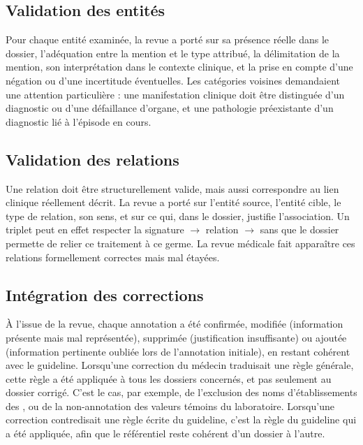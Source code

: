 \subsection{Validation des entités}\label{sec:c3-3-9-2}

Pour chaque entité examinée, la revue a porté sur sa présence réelle dans le dossier, l’adéquation entre la mention et le type attribué, la délimitation de la mention, son interprétation dans le contexte clinique, et la prise en compte d’une négation ou d’une incertitude éventuelles. Les catégories voisines demandaient une attention particulière : une manifestation clinique doit être distinguée d’un diagnostic ou d’une défaillance d’organe, et une pathologie préexistante d’un diagnostic lié à l’épisode en cours.

\subsection{Validation des relations}\label{sec:c3-3-9-3}

Une relation doit être structurellement valide, mais aussi correspondre au lien clinique réellement décrit. La revue a porté sur l’entité source, l’entité cible, le type de relation, son sens, et sur ce qui, dans le dossier, justifie l’association. Un triplet peut en effet respecter la signature  $\rightarrow$ relation $\rightarrow$  sans que le dossier permette de relier ce traitement à ce germe. La revue médicale fait apparaître ces relations formellement correctes mais mal étayées.

\subsection{Intégration des corrections}\label{sec:c3-3-9-4}

À l’issue de la revue, chaque annotation a été confirmée, modifiée (information présente mais mal représentée), supprimée (justification insuffisante) ou ajoutée (information pertinente oubliée lors de l’annotation initiale), en restant cohérent avec le guideline. Lorsqu’une correction du médecin traduisait une règle générale, cette règle a été appliquée à tous les dossiers concernés, et pas seulement au dossier corrigé. C’est le cas, par exemple, de l’exclusion des noms d’établissements des , ou de la non-annotation des valeurs témoins du laboratoire. Lorsqu’une correction contredisait une règle écrite du guideline, c’est la règle du guideline qui a été appliquée, afin que le référentiel reste cohérent d’un dossier à l’autre.

